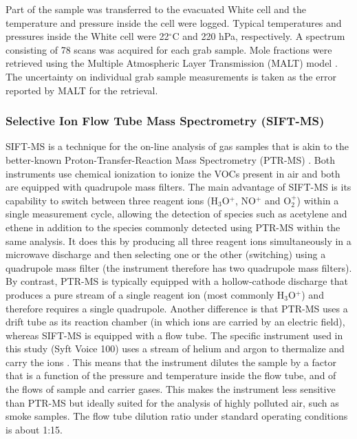 \documentclass[acp, manuscript]{copernicus}
\begin{document}
Part of the sample was transferred to the evacuated White cell and the temperature and pressure inside the cell were logged. Typical temperatures and pressures inside the White cell were 22$^\circ$C and 220 hPa, respectively. A spectrum consisting of 78 scans was acquired for each grab sample. Mole fractions were retrieved using the Multiple Atmospheric Layer Transmission (MALT) model \citep{Griffith1996,Griffith2012}. The uncertainty on individual grab sample measurements is taken as the error reported by MALT for the retrieval. 
 

\subsubsection{Selective Ion Flow Tube Mass Spectrometry (SIFT-MS)}
SIFT-MS is a technique for the on-line analysis of gas samples that is akin to the better-known Proton-Transfer-Reaction Mass Spectrometry (PTR-MS) \citep{Blake2009}. Both instruments use chemical ionization to ionize the VOCs present in air and both are equipped with quadrupole mass filters. The main advantage of SIFT-MS is its capability to switch between three reagent ions (H$_3$O$^+$, NO$^+$ and O$_{2}^+$) within a single measurement cycle, allowing the detection of species such as acetylene and ethene in addition to the species commonly detected using PTR-MS within the same analysis. It does this by producing all three reagent ions simultaneously in a microwave discharge and then selecting one or the other (switching) using a quadrupole mass filter (the instrument therefore has two quadrupole mass filters). By contrast, PTR-MS is typically equipped with a hollow-cathode discharge that produces a pure stream of a single reagent ion (most commonly H$_3$O$^+$) and therefore requires a single quadrupole. 
Another difference is that PTR-MS uses a drift tube as its reaction chamber (in which ions are carried by an electric field), whereas SIFT-MS is equipped with a flow tube. The specific instrument used in this study (Syft Voice 100) uses a stream of helium and argon to thermalize and carry the ions \citep{Milligan2007}. 
This means that the instrument dilutes the sample by a factor that is a function of the pressure and temperature inside the flow tube, and of the flows of sample and carrier gases. This makes the instrument less sensitive than PTR-MS \citep{Blake2009} but ideally suited for the analysis of highly polluted air, such as smoke samples. The flow tube dilution ratio under standard operating conditions is about 1:15.  
\end{document}

